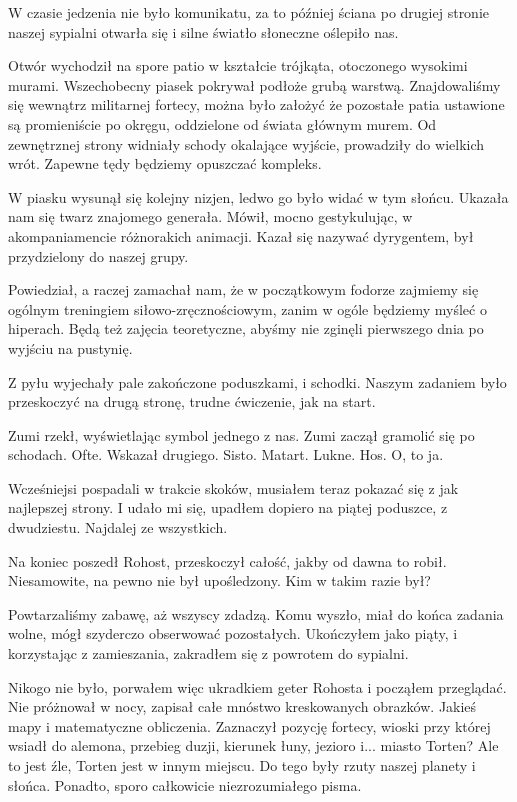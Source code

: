 W czasie jedzenia nie było komunikatu, za to później ściana po drugiej stronie naszej sypialni otwarła się i silne światło słoneczne oślepiło nas.

Otwór wychodził na spore patio w kształcie trójkąta, otoczonego wysokimi murami.
Wszechobecny piasek pokrywał podłoże grubą warstwą.
Znajdowaliśmy się wewnątrz militarnej fortecy, można było założyć że pozostałe patia ustawione są promieniście po okręgu, oddzielone od świata głównym murem.
Od zewnętrznej strony widniały schody okalające wyjście, prowadziły do wielkich wrót.
Zapewne tędy będziemy opuszczać kompleks.

W piasku wysunął się kolejny nizjen, ledwo go było widać w tym słońcu.
Ukazała nam się twarz znajomego generała.
Mówił, mocno gestykulując, w akompaniamencie różnorakich animacji.
Kazał się nazywać dyrygentem, był przydzielony do naszej grupy.

Powiedział, a raczej zamachał nam, że w początkowym fodorze zajmiemy się ogólnym treningiem siłowo-zręcznościowym, zanim w ogóle będziemy myśleć o hiperach.
Będą też zajęcia teoretyczne, abyśmy nie zginęli pierwszego dnia po wyjściu na pustynię.

Z pyłu wyjechały pale zakończone poduszkami, i schodki.
Naszym zadaniem było przeskoczyć na drugą stronę, trudne ćwiczenie, jak na start.
\begin{dialogue}
\ds{} Zumi \dm{} rzekł, wyświetlając symbol jednego z nas. Zumi zaczął gramolić się po schodach.
\ds{} Ofte. \dm{} Wskazał drugiego.
\ds{} Sisto.
\ds{} Matart.
\ds{} Lukne.
\ds{} Hos. \dm{} O, to ja.
\end{dialogue}
Wcześniejsi pospadali w trakcie skoków, musiałem teraz pokazać się z jak najlepszej strony.
I udało mi się, upadłem dopiero na piątej poduszce, z dwudziestu.
Najdalej ze wszystkich.

Na koniec poszedł Rohost, przeskoczył całość, jakby od dawna to robił.
Niesamowite, na pewno nie był upośledzony. Kim w takim razie był?

Powtarzaliśmy zabawę, aż wszyscy zdadzą.
Komu wyszło, miał do końca zadania wolne, mógł szyderczo obserwować pozostałych.
Ukończyłem jako piąty, i korzystając z zamieszania, zakradłem się z powrotem do sypialni.

Nikogo nie było, porwałem więc ukradkiem geter Rohosta i począłem przeglądać.
Nie próżnował w nocy, zapisał całe mnóstwo kreskowanych obrazków.
Jakieś mapy i matematyczne obliczenia.
Zaznaczył pozycję fortecy, wioski przy której wsiadł do alemona, przebieg duzji, kierunek łuny, jezioro i... miasto Torten? Ale to jest źle, Torten jest w innym miejscu.
Do tego były rzuty naszej planety i słońca.
Ponadto, sporo całkowicie niezrozumiałego pisma.

